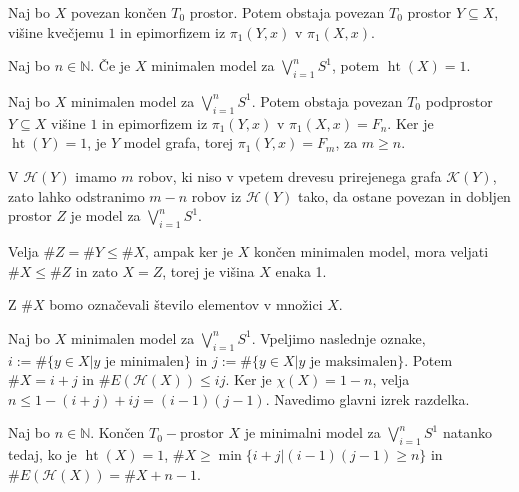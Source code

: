 \documentclass[mat1]{fmfdelo}
\DeclareRobustCommand{\k}{
    \mathcal{K}
}
\DeclareRobustCommand{\h}{
    \mathcal{H}
}
\DeclareMathOperator*{\htt}{ht}
\begin{document}
\begin{posledica}
    Naj bo $X$ povezan končen $T_0$ prostor. Potem obstaja povezan $T_0$ prostor $Y\subseteq X$, višine kvečjemu $1$ in epimorfizem iz $\pi_1(Y,x)$ v $\pi_1(X,x)$.
\end{posledica}

\begin{trditev}
    Naj bo $n\in\mathbb{N}$. Če je $X$ minimalen model za 
    $\bigvee\limits_{i=1}^{n}S^1$, potem $\htt(X)=1$.
\end{trditev}

\begin{dokaz}
    Naj bo $X$ minimalen model za $\bigvee\limits_{i=1}^{n}S^1$. Potem obstaja povezan $T_0$ podprostor $Y\subseteq X$ višine $1$ in epimorfizem iz $\pi_1(Y,x)$ v $\pi_1(X,x)=F_n$.
Ker je $\htt(Y)=1$, je $Y$ model grafa, torej $\pi_1(Y,x)=F_m$, za $m\geq n$.

    V $\h(Y)$ imamo $m$ robov, ki niso v vpetem drevesu prirejenega grafa $\k(Y)$, zato lahko odstranimo $m-n$ robov iz $\h(Y)$ tako, da ostane povezan in dobljen prostor $Z$ je model za $\bigvee\limits_{i=1}^{n}S^1$.

    Velja $\#Z=\#Y\leq \#X$, ampak ker je $X$ končen minimalen model, mora veljati $\#X\leq\#Z$ in zato $X=Z$, torej je višina $X$ enaka 1.
\end{dokaz}
Z $\# X$ bomo označevali število elementov v množici $X$.

Naj bo $X$ minimalen model za $\bigvee\limits_{i=1}^{n}S^1$. Vpeljimo naslednje oznake, $i:=\#\{y\in X| y \text{ je minimalen}\}$ in $j:=\#\{y\in X| y \text{ je maksimalen}\}$. Potem $\#X=i+j$ in $\#E(\h(X))\leq ij$. Ker je $\chi(X)=1-n$, velja $n\leq 1 - (i+j) + ij=(i-1)(j-1)$. Navedimo glavni izrek razdelka.

\begin{izrek}
    Naj bo $n\in\mathbb{N}$. Končen $T_0-$prostor $X$ je minimalni model za  $\bigvee\limits_{i=1}^{n}S^1$ natanko tedaj, ko je $\htt(X)=1$, $\#X\geq\min\{i+j|(i-1)(j-1)\geq n\}$ in $\#E(\h(X))= \#X + n -1.$
\end{izrek}
\end{document}
